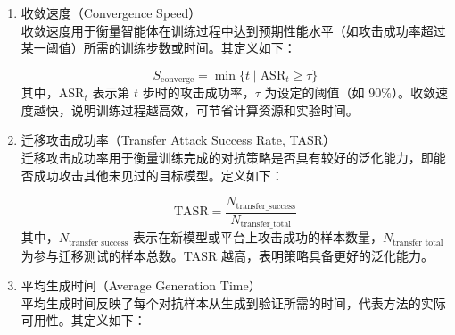 \begin{enumerate}[label=\arabic*)]
	\item 收敛速度（Convergence Speed）\\
	收敛速度用于衡量智能体在训练过程中达到预期性能水平（如攻击成功率超过某一阈值）所需的训练步数或时间。其定义如下：

	\begin{equation}
		S_{\text{converge}} = \min\{t \mid \text{ASR}_t \geq \tau\}
		\tag{5.6}
	\end{equation}
	其中，$\text{ASR}_t$ 表示第 $t$ 步时的攻击成功率，$\tau$ 为设定的阈值（如 90\%）。收敛速度越快，说明训练过程越高效，可节省计算资源和实验时间。

	
	\item 迁移攻击成功率（Transfer Attack Success Rate, TASR）\\
	迁移攻击成功率用于衡量训练完成的对抗策略是否具有较好的泛化能力，即能否成功攻击其他未见过的目标模型。定义如下：

	\begin{equation}
		\text{TASR} = \frac{N_{\text{transfer\_success}}}{N_{\text{transfer\_total}}}
		\tag{5.7}
	\end{equation}
	其中，$N_{\text{transfer\_success}}$ 表示在新模型或平台上攻击成功的样本数量，$N_{\text{transfer\_total}}$ 为参与迁移测试的样本总数。TASR 越高，表明策略具备更好的泛化能力。

	
	\item 平均生成时间（Average Generation Time）\\
	平均生成时间反映了每个对抗样本从生成到验证所需的时间，代表方法的实际可用性。其定义如下：


\end{enumerate}
